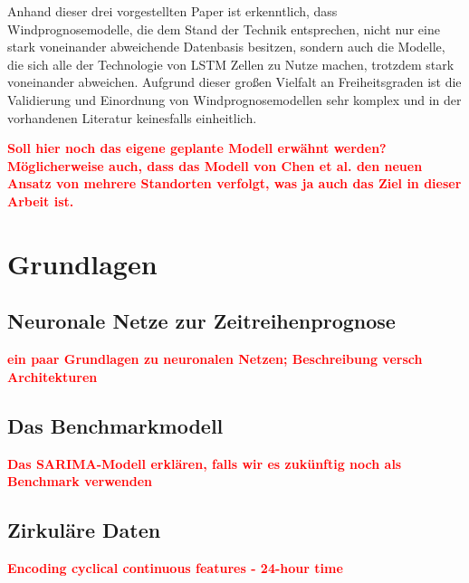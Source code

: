 \documentclass[
12pt, %
toc=listofnumbered, %
toc=chapterentrydotfill, %
numbers=noenddot, %
captions=tableheading, %
bibliography=numbered
]{scrreprt}
\let\Oldsection\section
\renewcommand{\section}{\FloatBarrier\Oldsection}
\newcommand{\highlight}[1]{\textbf{\textcolor{red}{#1}}}
\begin{document}
Anhand dieser drei vorgestellten Paper ist erkenntlich, dass Windprognosemodelle, die dem Stand der Technik entsprechen, nicht nur eine stark voneinander abweichende Datenbasis besitzen, sondern auch die Modelle, die sich alle der Technologie von LSTM Zellen 
zu Nutze machen, trotzdem stark voneinander abweichen. Aufgrund dieser großen Vielfalt an Freiheitsgraden ist die Validierung und Einordnung von Windprognosemodellen sehr komplex und in der vorhandenen Literatur keinesfalls einheitlich.

\highlight{
	Soll hier noch das eigene geplante Modell erwähnt werden? Möglicherweise auch, dass das Modell von Chen et al. den neuen Ansatz von mehrere Standorten verfolgt, was ja auch das Ziel in dieser Arbeit ist.
}



\chapter{Grundlagen}

\section{Neuronale Netze zur Zeitreihenprognose}
\highlight{ein paar Grundlagen zu neuronalen Netzen; 
Beschreibung versch Architekturen}

\section{Das Benchmarkmodell}
\highlight{Das SARIMA-Modell erklären, falls wir es zukünftig noch als Benchmark verwenden}

\section{Zirkuläre Daten}\label{section:circ_data}
\highlight{\cite{2016_London_EncodingCyclicalContinuous} Encoding cyclical continuous features - 24-hour time}
\end{document}
